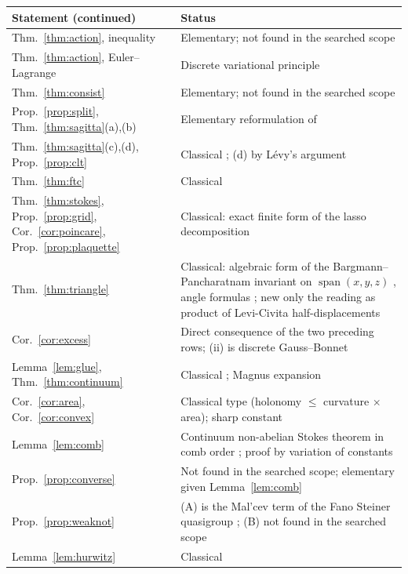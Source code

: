 \documentclass[11pt,reqno]{amsart}
\theoremstyle{definition}
\theoremstyle{remark}
\numberwithin{equation}{section}
\begin{document}
\begin{center}
\small
\begin{tabular}{@{}p{}p{}@{}}
\toprule
Statement (continued) & Status\\
\midrule
Thm.~\ref{thm:action}, inequality & Elementary; not found in the searched scope\\
Thm.~\ref{thm:action}, Euler--Lagrange & Discrete variational principle \cite{Veselov88,MV,MW}\\
Thm.~\ref{thm:consist} & Elementary; not found in the searched scope\\
Prop.~\ref{prop:split}, Thm.~\ref{thm:sagitta}(a),(b) & Elementary reformulation of \cite{Follmer}\\
Thm.~\ref{thm:sagitta}(c),(d), Prop.~\ref{prop:clt} & Classical \cite{Stroock,Hsu,RY,JP12}; (d) by L\'evy's argument\\
Thm.~\ref{thm:ftc} & Classical \cite{Volterra,DF,Slavik,CG,IMNZ,Iserles01,DLP,Sharpe}\\
Thm.~\ref{thm:stokes}, Prop.~\ref{prop:grid}, Cor.~\ref{cor:poincare}, Prop.~\ref{prop:plaquette} & Classical: exact finite form of the lasso decomposition \cite{Arefeva,Bralic80,Levy03,Levy10,KMR}\\
Thm.~\ref{thm:triangle} & Classical: algebraic form of the Bargmann--Pancharatnam invariant on $\operatorname{span}(x,y,z)$ \cite{SB88,MS93}, angle formulas \cite{Todhunter,VOS,Eriksson}; new only the reading as product of Levi-Civita half-displacements\\
Cor.~\ref{cor:excess} & Direct consequence of the two preceding rows; (ii) is discrete Gauss--Bonnet\\
Lemma~\ref{lem:glue}, Thm.~\ref{thm:continuum} & Classical \cite{MT,Thomassen}; Magnus expansion \cite{Magnus}\\
Cor.~\ref{cor:area}, Cor.~\ref{cor:convex} & Classical type (holonomy $\le$ curvature $\times$ area); sharp constant\\
Lemma~\ref{lem:comb} & Continuum non-abelian Stokes theorem in comb order \cite{Arefeva,KMR}; proof by variation of constants\\
Prop.~\ref{prop:converse} & Not found in the searched scope; elementary given Lemma~\ref{lem:comb}\\
Prop.~\ref{prop:weaknot} & (A) is the Mal'cev term of the Fano Steiner quasigroup \cite{Quackenbush76}; (B) not found in the searched scope\\
Lemma~\ref{lem:hurwitz} & Classical \cite[Ch.~1]{SV00}\\

\end{tabular}
\end{center}
\end{document}
